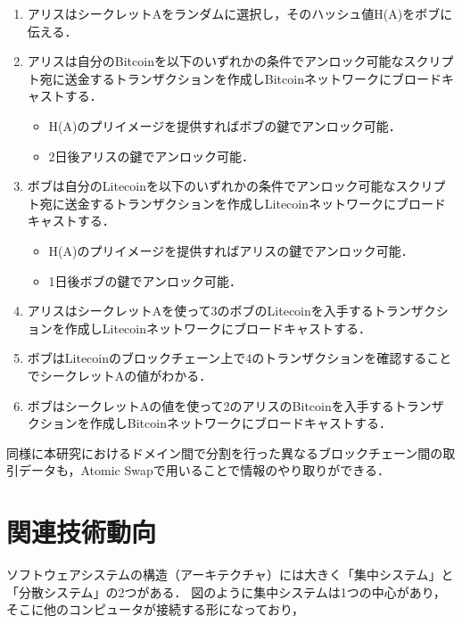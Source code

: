 \documentclass[a4paper,12pt]{jsarticle}
\begin{document}
\begin{enumerate}
  \item アリスはシークレットAをランダムに選択し，そのハッシュ値H(A)をボブに伝える．
  \item アリスは自分のBitcoinを以下のいずれかの条件でアンロック可能なスクリプト宛に送金するトランザクションを作成しBitcoinネットワークにブロードキャストする．
%
  \begin{itemize}
    \item H(A)のプリイメージを提供すればボブの鍵でアンロック可能．
    \item 2日後アリスの鍵でアンロック可能．
  \end{itemize} 
  \item ボブは自分のLitecoinを以下のいずれかの条件でアンロック可能なスクリプト宛に送金するトランザクションを作成しLitecoinネットワークにブロードキャストする．
%
  \begin{itemize}
    \item H(A)のプリイメージを提供すればアリスの鍵でアンロック可能．
    \item 1日後ボブの鍵でアンロック可能．
  \end{itemize}
%
  \item アリスはシークレットAを使って3のボブのLitecoinを入手するトランザクションを作成しLitecoinネットワークにブロードキャストする．
  \item ボブはLitecoinのブロックチェーン上で4のトランザクションを確認することでシークレットAの値がわかる．
  \item ボブはシークレットAの値を使って2のアリスのBitcoinを入手するトランザクションを作成しBitcoinネットワークにブロードキャストする．
\end{enumerate}

同様に本研究におけるドメイン間で分割を行った異なるブロックチェーン間の取引データも，Atomic Swapで用いることで情報のやり取りができる．

\newpage
\section{関連技術動向}
ソフトウェアシステムの構造（アーキテクチャ）には大きく「集中システム」と「分散システム」の2つがある．
図のように集中システムは1つの中心があり，そこに他のコンピュータが接続する形になっており，
\end{document}
